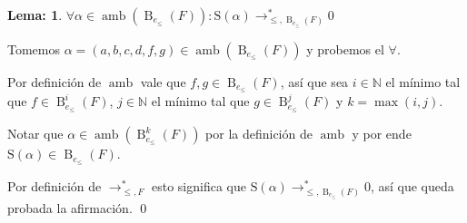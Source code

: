 \documentclass{amsbook} %
\theoremstyle{customstyle}
\newtheorem{lemma}{Lema:}[chapter]
\renewenvironment{proof}[1][\proofname]{{\bfseries #1: }}{\qed} %
\theoremstyle{factstyle}
\DeclareMathOperator{\amb}{amb}
\renewcommand{\S}{\text{S}}
\DeclareMathOperator{\B}{B}
\begin{document}
\begin{lemma}\label{lemma:Buchberger correctitud:6}
$∀α ∈ \amb(\B_{e_≤}(F)) : \S(α) →^*_{≤, \B_{e_≤}(F)} 0$
\end{lemma}
\begin{proof}
Tomemos $α = (a, b, c, d, f, g) ∈ \amb(\B_{e_≤}(F))$ y probemos el $∀$.

Por definición de $\amb$ vale que $f, g ∈ \B_{e_≤}(F)$, así que sea $i ∈ ℕ$ el mínimo tal que $f ∈ \B_{e_≤}^i(F)$, $j ∈ ℕ$ el mínimo tal que $g ∈ \B_{e_≤}^j(F)$ y $k = \max(i, j)$.

Notar que $α ∈ \amb(\B_{e_≤}^k(F))$ por la definición de $\amb$ y por ende $\S(α) ∈ \B_{e_≤}(F)$.

Por definición de $→^*_{≤, F}$ esto significa que $\S(α) →^*_{≤, \B_{e_≤}(F)} 0$, así que queda probada la afirmación.
\end{proof}
\end{document}
